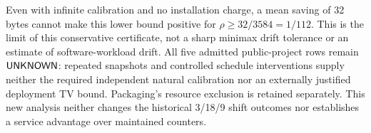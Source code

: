 Even with infinite calibration and no installation charge, a mean saving
of 32 bytes cannot make this lower bound positive for
$\rho\ge32/3584=1/112$. This is the limit of this conservative certificate,
not a sharp minimax drift tolerance or an estimate of software-workload drift.
All five admitted public-project rows remain $\mathsf{UNKNOWN}$: repeated
snapshots and controlled schedule interventions supply neither the required
independent natural calibration nor an externally justified deployment TV
bound. Packaging's resource exclusion is retained separately. This new
analysis neither changes the historical 3/18/9 shift outcomes nor establishes
a service advantage over maintained counters.
